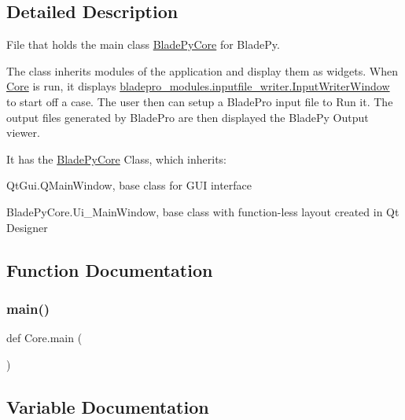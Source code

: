 \subsection{Detailed Description}
File that holds the main class \hyperlink{class_core_1_1_blade_py_core}{Blade\+Py\+Core} for Blade\+Py. 

The class inherits modules of the application and display them as widgets. When \hyperlink{namespace_core}{Core} is run, it displays \hyperlink{classbladepro__modules_1_1inputfile__writer_1_1_input_writer_window}{bladepro\+\_\+modules.\+inputfile\+\_\+writer.\+Input\+Writer\+Window} to start off a case. The user then can setup a Blade\+Pro input file to Run it. The output files generated by Blade\+Pro are then displayed the Blade\+Py Output viewer.

It has the \hyperlink{class_core_1_1_blade_py_core}{Blade\+Py\+Core} Class, which inherits\+:

\begin{DoxyItemize}
\item {\ttfamily Qt\+Gui.\+Q\+Main\+Window}, base class for G\+UI interface \item {\ttfamily Blade\+Py\+Core.\+Ui\+\_\+\+Main\+Window}, base class with function-\/less layout created in Qt Designer \end{DoxyItemize}


\subsection{Function Documentation}
\hypertarget{namespace_core_abbe2fb717a0d4efddde9090f186bd64b}{}\label{namespace_core_abbe2fb717a0d4efddde9090f186bd64b} 
\subsubsection{\texorpdfstring{main()}{main()}}
{\footnotesize\ttfamily def Core.\+main (\begin{DoxyParamCaption}{ }\end{DoxyParamCaption})}



\subsection{Variable Documentation}
\hypertarget{namespace_core_a929c2310eb32ddd6da7fa2835f7f96d1}{}\label{namespace_core_a929c2310eb32ddd6da7fa2835f7f96d1} 

